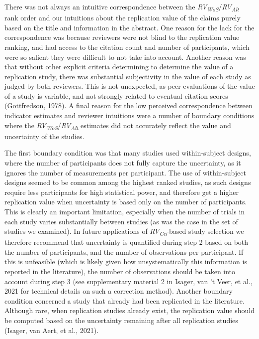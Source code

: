 \documentclass[
  man,floatsintext]{apa6}
\begin{document}
There was not always an intuitive correspondence between the \emph{RV\textsubscript{WoS}}/\emph{RV\textsubscript{Alt}} rank order and our intuitions about the replication value of the claims purely based on the title and information in the abstract. One reason for the lack for the correspondence was because reviewers were not blind to the replication value ranking, and had access to the citation count and number of participants, which were so salient they were difficult to not take into account. Another reason was that without other explicit criteria determining to determine the value of a replication study, there was substantial subjectivity in the value of each study as judged by both reviewers. This is not unexpected, as peer evaluations of the value of a study is variable, and not strongly related to eventual citation scores (Gottfredson, 1978). A final reason for the low perceived correspondence between indicator estimates and reviewer intuitions were a number of boundary conditions where the \emph{RV\textsubscript{WoS}}/\emph{RV\textsubscript{Alt}} estimates did not accurately reflect the value and uncertainty of the studies.

The first boundary condition was that many studies used within-subject designs, where the number of participants does not fully capture the uncertainty, as it ignores the number of measurements per participant. The use of within-subject designs seemed to be common among the highest ranked studies, as such designs require less participants for high statistical power, and therefore get a higher replication value when uncertainty is based only on the number of participants. This is clearly an important limitation, especially when the number of trials in each study varies substantially between studies (as was the case in the set of studies we examined). In future applications of \emph{RV\textsubscript{Cn}}-based study selection we therefore recommend that uncertainty is quantified during step 2 based on both the number of participants, and the number of observations per participant. If this is unfeasible (which is likely given how unsystematically this information is reported in the literature), the number of observations should be taken into account during step 3 (see supplementary material 2 in Isager, van 't Veer, et al., 2021 for technical details on such a correction method). Another boundary condition concerned a study that already had been replicated in the literature. Although rare, when replication studies already exist, the replication value should be computed based on the uncertainty remaining after all replication studies (Isager, van Aert, et al., 2021).
\end{document}

